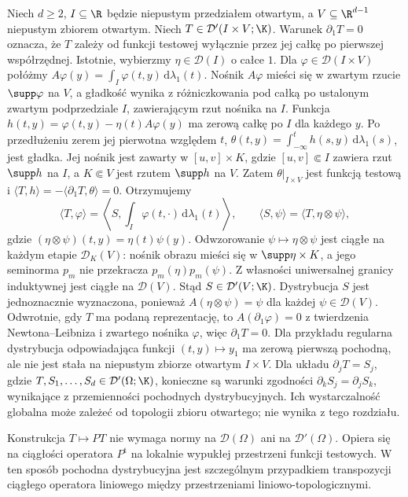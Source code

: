 \begin{uwaga}
\label{rem:limits20}
Niech $d\ge2$, $I\subseteq\R$ będzie niepustym przedziałem
otwartym, a $V\subseteq\R^{d-1}$ niepustym zbiorem otwartym.
Niech $T\in\mathcal D'(I\times V;\K)$.
Warunek $\partial_1T=0$ oznacza, że $T$ zależy od funkcji
testowej wyłącznie przez jej całkę po pierwszej współrzędnej.
Istotnie, wybierzmy $\eta\in\mathcal D(I)$ o całce $1$.
Dla $\varphi\in\mathcal D(I\times V)$ połóżmy
$A\varphi(y)=\int_I\varphi(t,y)\,\mathrm d\lambda_1(t)$.
Nośnik $A\varphi$ mieści się w zwartym rzucie
$\supp\varphi$ na $V$, a gładkość wynika z różniczkowania
pod całką po ustalonym zwartym podprzedziale $I$,
zawierającym rzut nośnika na $I$.
Funkcja $h(t,y)=\varphi(t,y)-\eta(t)A\varphi(y)$ ma zerową
całkę po $I$ dla każdego $y$.
Po przedłużeniu zerem jej pierwotna względem $t$,
$\theta(t,y)=\int_{-\infty}^t h(s,y)\,\mathrm d\lambda_1(s)$,
jest gładka. Jej nośnik jest zawarty w $[u,v]\times K$,
gdzie $[u,v]\Subset I$ zawiera rzut $\supp h$ na $I$,
a $K\Subset V$ jest rzutem $\supp h$ na $V$.
Zatem $\theta|_{I\times V}$ jest funkcją testową i
$\langle T,h\rangle=-\langle\partial_1T,\theta\rangle=0$.
Otrzymujemy
\[
\langle T,\varphi\rangle
=\left\langle S,\int_I\varphi(t,\cdot)\,\mathrm d\lambda_1(t)\right\rangle,
\qquad
\langle S,\psi\rangle=\langle T,\eta\otimes\psi\rangle,
\]
gdzie $(\eta\otimes\psi)(t,y)=\eta(t)\psi(y)$.
Odwzorowanie $\psi\mapsto\eta\otimes\psi$ jest ciągłe
na każdym etapie $\mathcal D_K(V)$: nośnik obrazu mieści
się w $\supp\eta\times K$, a jego seminorma $p_m$ nie
przekracza $p_m(\eta)p_m(\psi)$. Z własności uniwersalnej
granicy induktywnej jest ciągłe na $\mathcal D(V)$.
Stąd $S\in\mathcal D'(V;\K)$. Dystrybucja $S$ jest jednoznacznie wyznaczona,
ponieważ $A(\eta\otimes\psi)=\psi$ dla każdej $\psi\in\mathcal D(V)$.
Odwrotnie, gdy $T$ ma podaną reprezentację, to
$A(\partial_1\varphi)=0$ z twierdzenia Newtona--Leibniza
i zwartego nośnika $\varphi$, więc $\partial_1T=0$.
Dla przykładu regularna dystrybucja odpowiadająca funkcji
$(t,y)\mapsto y_1$ ma zerową pierwszą pochodną, ale
nie jest stała na niepustym zbiorze otwartym $I\times V$.
Dla układu $\partial_jT=S_j$, gdzie
$T,S_1,\ldots,S_d\in\mathcal D'(\Omega;\K)$, konieczne są warunki zgodności
$\partial_kS_j=\partial_jS_k$, wynikające z przemienności
pochodnych dystrybucyjnych. Ich wystarczalność globalna
może zależeć od topologii zbioru otwartego; nie wynika z tego
rozdziału.
\end{uwaga}

\begin{uwaga}
\label{rem:tvs-derivative20}
Konstrukcja $T\mapsto PT$ nie wymaga normy na
$\mathcal D(\Omega)$ ani na $\mathcal D'(\Omega)$.
Opiera się na ciągłości operatora $P^{\mathrm t}$ na
lokalnie wypukłej przestrzeni funkcji testowych.
W ten sposób pochodna dystrybucyjna jest szczególnym
przypadkiem transpozycji ciągłego operatora liniowego
między przestrzeniami liniowo-topologicznymi.
\end{uwaga}
